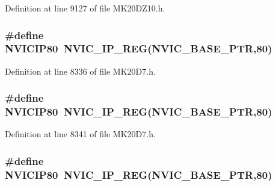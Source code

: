 Definition at line 9127 of file M\+K20\+D\+Z10.\+h.

\subsubsection[{\texorpdfstring{N\+V\+I\+C\+I\+P80}{NVICIP80}}]{\setlength{\rightskip}{0pt plus 5cm}\#define N\+V\+I\+C\+I\+P80~{\bf N\+V\+I\+C\+\_\+\+I\+P\+\_\+\+R\+EG}({\bf N\+V\+I\+C\+\_\+\+B\+A\+S\+E\+\_\+\+P\+TR},80)}\hypertarget{group___n_v_i_c___register___accessor___macros_gad0da1affa6ef6fde24c76c8f2c1f2ae7}{}\label{group___n_v_i_c___register___accessor___macros_gad0da1affa6ef6fde24c76c8f2c1f2ae7}


Definition at line 8336 of file M\+K20\+D7.\+h.

\subsubsection[{\texorpdfstring{N\+V\+I\+C\+I\+P80}{NVICIP80}}]{\setlength{\rightskip}{0pt plus 5cm}\#define N\+V\+I\+C\+I\+P80~{\bf N\+V\+I\+C\+\_\+\+I\+P\+\_\+\+R\+EG}({\bf N\+V\+I\+C\+\_\+\+B\+A\+S\+E\+\_\+\+P\+TR},80)}\hypertarget{group___n_v_i_c___register___accessor___macros_gad0da1affa6ef6fde24c76c8f2c1f2ae7}{}\label{group___n_v_i_c___register___accessor___macros_gad0da1affa6ef6fde24c76c8f2c1f2ae7}


Definition at line 8341 of file M\+K20\+D7.\+h.

\subsubsection[{\texorpdfstring{N\+V\+I\+C\+I\+P80}{NVICIP80}}]{\setlength{\rightskip}{0pt plus 5cm}\#define N\+V\+I\+C\+I\+P80~{\bf N\+V\+I\+C\+\_\+\+I\+P\+\_\+\+R\+EG}({\bf N\+V\+I\+C\+\_\+\+B\+A\+S\+E\+\_\+\+P\+TR},80)}\hypertarget{group___n_v_i_c___register___accessor___macros_gad0da1affa6ef6fde24c76c8f2c1f2ae7}{}\label{group___n_v_i_c___register___accessor___macros_gad0da1affa6ef6fde24c76c8f2c1f2ae7}


